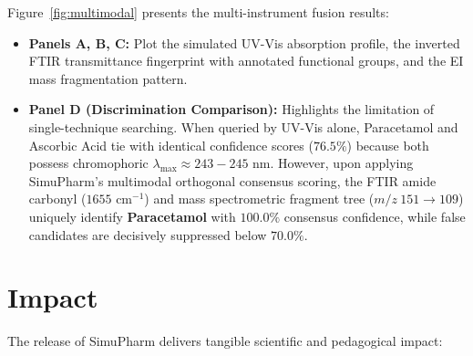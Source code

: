 \documentclass[final,5p,times,twocolumn]{elsarticle}
\begin{document}
Figure~\ref{fig:multimodal} presents the multi-instrument fusion results:
\begin{itemize}
    \item \textbf{Panels A, B, C:} Plot the simulated UV-Vis absorption profile, the inverted FTIR transmittance fingerprint with annotated functional groups, and the EI mass fragmentation pattern.
    \item \textbf{Panel D (Discrimination Comparison):} Highlights the limitation of single-technique searching. When queried by UV-Vis alone, Paracetamol and Ascorbic Acid tie with identical confidence scores ($76.5\%$) because both possess chromophoric $\lambda_{\max} \approx 243 - 245 \text{ nm}$. However, upon applying SimuPharm's multimodal orthogonal consensus scoring, the FTIR amide carbonyl ($1655 \text{ cm}^{-1}$) and mass spectrometric fragment tree ($m/z \ 151 \to 109$) uniquely identify \textbf{Paracetamol} with $100.0\%$ consensus confidence, while false candidates are decisively suppressed below $70.0\%$.
\end{itemize}

\section{Impact}
\label{sec:impact}

The release of SimuPharm delivers tangible scientific and pedagogical impact:
\end{document}
